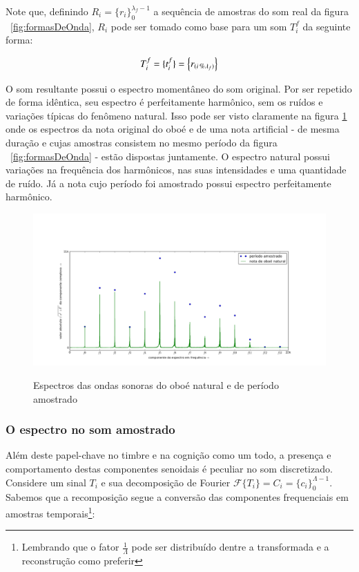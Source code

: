 Note que, definindo $ R_i=\{ r_i \}_0^{\lambda_f-1}$ a sequência de amostras do som real da figura ~\ref{fig:formasDeOnda},
$R_i$ pode ser tomado como base para um som $T_i^f$ da seguinte forma: 

\begin{equation}\label{sampleandoFormaDeOnda}
     T^f_i=\{ t_i^f \}=\Bigl\{ r_{(i\,\%\lambda_{f})} \Bigr\}
\end{equation}

O som resultante possui o espectro momentâneo do som original. Por ser repetido de forma idêntica,
seu espectro é perfeitamente harmônico, sem os ruídos e variações típicas do fenômeno natural. Isso pode ser 
visto claramente na figura \ref{fig:espectroOboe} onde os espectros da nota original do oboé e de uma nota 
artificial - de mesma duração e cujas amostras consistem no mesmo período da figura ~\ref{fig:formasDeOnda} - estão dispostas juntamente. O espectro natural possui variações na frequência dos harmônicos, nas suas intensidades e uma quantidade de ruído. Já a nota cujo período foi amostrado possui espectro perfeitamente harmônico.



\begin{figure}[h!]
    \centering
    \caption{Espectros das ondas sonoras do oboé natural e de período amostrado}
        \includegraphics[width=\textwidth]{figuras/espectroOboeAmostradoNatural2}
        \label{fig:espectroOboe}
\end{figure}





\subsubsection{O espectro no som amostrado}
Além deste papel-chave no timbre e na cognição como um todo, a presença e comportamento destas componentes senoidais é peculiar no som discretizado. Considere um sinal $T_i$ e sua decomposição de Fourier $\mathcal{F}\{T_i\}=C_i=\{c_i\}_0^{\Lambda-1}$. Sabemos que a recomposição segue a conversão das componentes frequenciais em amostras temporais\footnote{Lembrando que o fator $\frac{1}{\Lambda}$ pode ser distribuído dentre a transformada e a reconstrução como preferir}:


